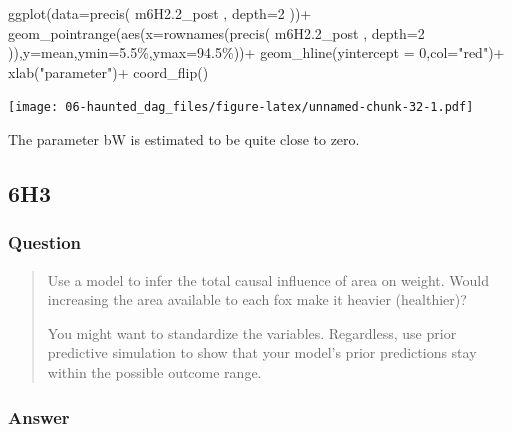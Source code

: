 \documentclass[
]{book}
\newenvironment{Shaded}{\begin{snugshade}}{\end{snugshade}}
\newcommand{\AttributeTok}[1]{\textcolor[rgb]{0.77,0.63,0.00}{#1}}
\newcommand{\DecValTok}[1]{\textcolor[rgb]{0.00,0.00,0.81}{#1}}
\newcommand{\FloatTok}[1]{\textcolor[rgb]{0.00,0.00,0.81}{#1}}
\newcommand{\FunctionTok}[1]{\textcolor[rgb]{0.00,0.00,0.00}{#1}}
\newcommand{\NormalTok}[1]{#1}
\newcommand{\SpecialCharTok}[1]{\textcolor[rgb]{0.00,0.00,0.00}{#1}}
\newcommand{\StringTok}[1]{\textcolor[rgb]{0.31,0.60,0.02}{#1}}
\begin{document}
\begin{Shaded}
\begin{Highlighting}[]
\FunctionTok{ggplot}\NormalTok{(}\AttributeTok{data=}\FunctionTok{precis}\NormalTok{( m6H2}\FloatTok{.2}\NormalTok{\_post , }\AttributeTok{depth=}\DecValTok{2}\NormalTok{ ))}\SpecialCharTok{+}
  \FunctionTok{geom\_pointrange}\NormalTok{(}\FunctionTok{aes}\NormalTok{(}\AttributeTok{x=}\FunctionTok{rownames}\NormalTok{(}\FunctionTok{precis}\NormalTok{( m6H2}\FloatTok{.2}\NormalTok{\_post , }\AttributeTok{depth=}\DecValTok{2}\NormalTok{ )),}\AttributeTok{y=}\NormalTok{mean,}\AttributeTok{ymin=}\StringTok{\textasciigrave{}}\AttributeTok{5.5\%}\StringTok{\textasciigrave{}}\NormalTok{,}\AttributeTok{ymax=}\StringTok{\textasciigrave{}}\AttributeTok{94.5\%}\StringTok{\textasciigrave{}}\NormalTok{))}\SpecialCharTok{+}
  \FunctionTok{geom\_hline}\NormalTok{(}\AttributeTok{yintercept =} \DecValTok{0}\NormalTok{,}\AttributeTok{col=}\StringTok{"red"}\NormalTok{)}\SpecialCharTok{+}
  \FunctionTok{xlab}\NormalTok{(}\StringTok{"parameter"}\NormalTok{)}\SpecialCharTok{+}
  \FunctionTok{coord\_flip}\NormalTok{()}
\end{Highlighting}
\end{Shaded}

\texttt{[image: 06-haunted\_dag\_files/figure-latex/unnamed-chunk-32-1.pdf]}

The parameter bW is estimated to be quite close to zero.

\hypertarget{h3-2}{%
\subsection*{6H3}\label{h3-2}}

\hypertarget{question-57}{%
\subsubsection*{Question}\label{question-57}}

\begin{quote}
Use a model to infer the total causal influence of area on weight. Would increasing the area available to each fox make it heavier (healthier)?

You might want to standardize the variables. Regardless, use prior predictive simulation to show that your model's prior predictions stay within the possible outcome range.
\end{quote}

\hypertarget{answer-57}{%
\subsubsection*{Answer}\label{answer-57}}
\end{document}
